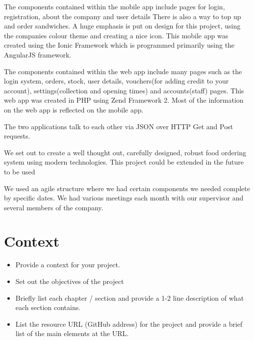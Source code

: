 The components contained within the mobile app include pages for login, registration, about the company and user details There is also a way to top up and order sandwiches.
A huge emphasis is put on design for this project, using the companies colour theme and creating a nice icon.
This mobile app was created using the Ionic Framework which is programmed primarily using the AngularJS framework.

The components contained within the web app include many pages such as the login system, orders, stock, user details, vouchers(for adding credit to your account), settings(collection and opening times) and accounts(staff) pages.
This web app was created in PHP using Zend Framework 2.
Most of the information on the web app is reflected on the mobile app.

The two applications talk to each other via JSON over HTTP Get and Post requests. 

We set out to create a well thought out, carefully designed, robust food ordering system using modern technologies.
This project could be extended in the future to be used 
\linebreak



We used an agile structure where we had certain components we needed complete by specific dates.
We had various meetings each month with our supervisor and several members of the company.








\chapter{Context}	%
\begin{itemize}
\item Provide a context for your project.
\item Set out the objectives of the project
\item Briefly list each chapter / section and provide a 1-2 line description of what each section contains.
\item List the resource URL (GitHub address) for the project and provide a brief list of the main elements at the URL.
\end{itemize}

